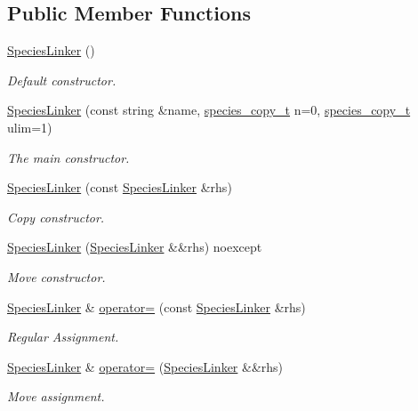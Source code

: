 \subsection*{Public Member Functions}
\begin{DoxyCompactItemize}
\item 
\hyperlink{classSpeciesLinker_abb405437f0bef015115499a06ca70fe8}{Species\+Linker} ()
\begin{DoxyCompactList}\small\item\em Default constructor. \end{DoxyCompactList}\item 
\hyperlink{classSpeciesLinker_a62d3acd60639f435bca8ca20d821280b}{Species\+Linker} (const string \&name, \hyperlink{common_8h_a3503f321fd36304ee274141275cca586}{species\+\_\+copy\+\_\+t} n=0, \hyperlink{common_8h_a3503f321fd36304ee274141275cca586}{species\+\_\+copy\+\_\+t} ulim=1)
\begin{DoxyCompactList}\small\item\em The main constructor. \end{DoxyCompactList}\item 
\hyperlink{classSpeciesLinker_a608df9d3975441a42566635edc9b6fa0}{Species\+Linker} (const \hyperlink{classSpeciesLinker}{Species\+Linker} \&rhs)
\begin{DoxyCompactList}\small\item\em Copy constructor. \end{DoxyCompactList}\item 
\hyperlink{classSpeciesLinker_a50d828566a3cc5ae5aa1532e5eaa0ae4}{Species\+Linker} (\hyperlink{classSpeciesLinker}{Species\+Linker} \&\&rhs) noexcept
\begin{DoxyCompactList}\small\item\em Move constructor. \end{DoxyCompactList}\item 
\hyperlink{classSpeciesLinker}{Species\+Linker} \& \hyperlink{classSpeciesLinker_a34f5b40037ef0788868a580fb70690b4}{operator=} (const \hyperlink{classSpeciesLinker}{Species\+Linker} \&rhs)
\begin{DoxyCompactList}\small\item\em Regular Assignment. \end{DoxyCompactList}\item 
\hyperlink{classSpeciesLinker}{Species\+Linker} \& \hyperlink{classSpeciesLinker_a83599a03e520252f456ea45046efd654}{operator=} (\hyperlink{classSpeciesLinker}{Species\+Linker} \&\&rhs)
\begin{DoxyCompactList}\small\item\em Move assignment. \end{DoxyCompactList}\item 

\end{DoxyCompactItemize}
